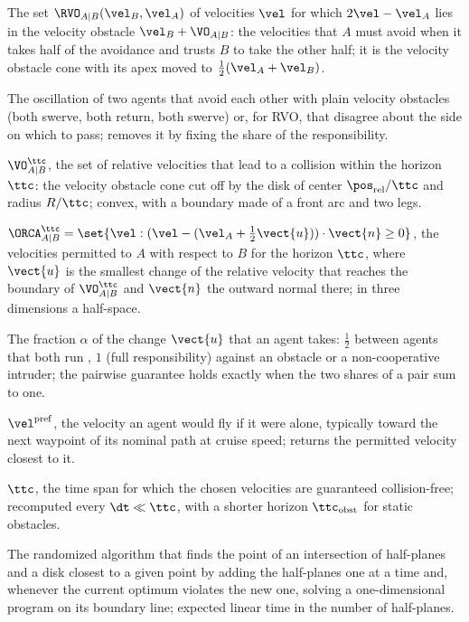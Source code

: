 \item[Reciprocal velocity obstacle (RVO)] The set $\RVO_{A|B}(\vel_B,\vel_A)$ of velocities $\vel$ for which $2\vel-\vel_A$ lies in the velocity obstacle $\vel_B+\VO_{A|B}$: the velocities that $A$ must avoid when it takes half of the avoidance and trusts $B$ to take the other half; it is the velocity obstacle cone with its apex moved to $\tfrac12(\vel_A+\vel_B)$.
\item[Reciprocal dance] The oscillation of two agents that avoid each other with plain velocity obstacles (both swerve, both return, both swerve) or, for RVO, that disagree about the side on which to pass; \orca removes it by fixing the share of the responsibility.
\item[Truncated velocity obstacle] $\VO^{\ttc}_{A|B}$, the set of relative velocities that lead to a collision within the horizon $\ttc$: the velocity obstacle cone cut off by the disk of center $\pos_{\mathrm{rel}}/\ttc$ and radius $R/\ttc$; convex, with a boundary made of a front arc and two legs.
\item[ORCA half-plane] $\ORCA^{\ttc}_{A|B}=\set{\vel : (\vel-(\vel_A+\tfrac12\vect{u}))\cdot\vect{n}\ge0}$, the velocities permitted to $A$ with respect to $B$ for the horizon $\ttc$, where $\vect{u}$ is the smallest change of the relative velocity that reaches the boundary of $\VO^{\ttc}_{A|B}$ and $\vect{n}$ the outward normal there; in three dimensions a half-space.
\item[Responsibility share] The fraction $\alpha$ of the change $\vect{u}$ that an agent takes: $\tfrac12$ between agents that both run \orca, $1$ (full responsibility) against an obstacle or a non-cooperative intruder; the pairwise guarantee holds exactly when the two shares of a pair sum to one.
\item[Preferred velocity] $\vel^{\mathrm{pref}}$, the velocity an agent would fly if it were alone, typically toward the next waypoint of its nominal path at cruise speed; \orca returns the permitted velocity closest to it.
\item[Time horizon (ORCA)] $\ttc$, the time span for which the chosen velocities are guaranteed collision-free; recomputed every $\dt\ll\ttc$, with a shorter horizon $\ttc_{\mathrm{obst}}$ for static obstacles.
\item[Incremental linear program] The randomized algorithm that finds the point of an intersection of half-planes and a disk closest to a given point by adding the half-planes one at a time and, whenever the current optimum violates the new one, solving a one-dimensional program on its boundary line; expected linear time in the number of half-planes.
